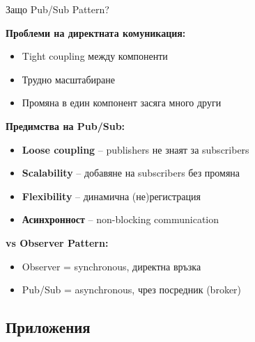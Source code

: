 \documentclass[aspectratio=169]{beamer}
\begin{document}
\begin{frame}{Защо Pub/Sub Pattern?}

\textbf{Проблеми на директната комуникация:}
\begin{itemize}
    \item Tight coupling между компоненти
    \item Трудно масштабиране
    \item Промяна в един компонент засяга много други
\end{itemize}

\vspace{0.4cm}

\textbf{Предимства на Pub/Sub:}
\begin{itemize}
    \item[\checkmark] \textbf{Loose coupling} – publishers не знаят за subscribers
    \item[\checkmark] \textbf{Scalability} – добавяне на subscribers без промяна
    \item[\checkmark] \textbf{Flexibility} – динамична (не)регистрация
    \item[\checkmark] \textbf{Асинхронност} – non-blocking communication
\end{itemize}

\vspace{0.4cm}

\textbf{vs Observer Pattern:}
\begin{itemize}
    \item Observer = synchronous, директна връзка
    \item Pub/Sub = asynchronous, чрез посредник (broker)
\end{itemize}
\end{frame}

\subsection{Приложения}
\end{document}
